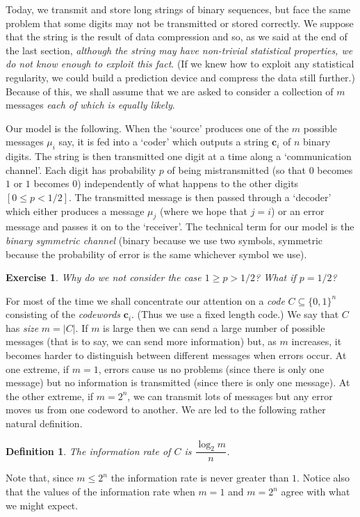 \documentclass[12pt,a4paper]{article}
\theoremstyle{plain}
\newtheorem{definition}[theorem]{Definition}
\newtheorem{exercise}[theorem]{Exercise}
\theoremstyle{definition}
\begin{document}
    Today, we transmit and store long strings of
    binary sequences, but face the same problem
    that some digits may not be transmitted or stored correctly.
    We suppose that the string is the result of data compression
    and so, as we said at the end of the last
    section, \emph{although the string
    may have non-trivial
    statistical properties,
    we do not know
    enough to exploit this fact}. (If we knew how to
    exploit any statistical regularity, we could build a
    prediction device and compress the data still further.)
    Because of this, we shall assume that
    we are asked to consider a collection
    of $m$ messages \emph{each of which is equally
    likely}.

    Our model is the following. When the `source'
    produces one of the $m$ possible messages $\mu_{i}$ say,
    it is fed into a `coder' which outputs
    a string $\mathbf{c}_{i}$ of $n$ binary digits.
    The string is then transmitted one digit
    at a time along a `communication channel'.
    Each digit has probability $p$ of being mistransmitted
    (so that $0$ becomes $1$ or $1$ becomes $0$)
    independently of what happens to the other digits $[0\leq p<1/2]$.
    The transmitted message is then passed through
    a `decoder' which either produces a message $\mu_{j}$
    (where we hope that $j=i$) or an error message
    and passes it on to the `receiver'.
    The technical term for our model is the
    \emph{binary symmetric channel} (binary because
    we use two symbols, symmetric because
    the probability of error is the same whichever
    symbol we use).
    \begin{exercise}
        \label{Reverse} Why do we not consider
        the case $1\geq p>1/2$? What
        if $p=1/2$?
    \end{exercise}

    For most of the time we shall concentrate our attention
    on a \emph{code} $C\subseteq\{0,1\}^{n}$ consisting
    of the \emph{codewords} $\mathbf{c}_{i}$.
    (Thus we use a fixed length code.) We say that
    $C$ has \emph{size} $m=|C|$.
    If $m$ is large then
    we can send a large number of possible messages
    (that is to say, we can send more information) but,
    as $m$ increases, it becomes harder to distinguish
    between different messages when errors occur.
    At one extreme, if $m=1$, errors cause us no problems
    (since there is only one message) but no information
    is transmitted (since there is only one message).
    At the other extreme, if $m=2^{n}$, we can transmit
    lots of messages but any error moves us from one
    codeword to another. We are led to the following
    rather natural definition.
    \begin{definition}
        \label{information rate}
        The information rate of $C$ is
        $\dfrac{\log_{2} m}{n}$.
    \end{definition}
    Note that, since $m\leq 2^{n}$ the information rate
    is never greater than $1$. Notice also that the values of
    the information rate when $m=1$ and $m=2^{n}$ agree
    with what we might expect.
\end{document}
